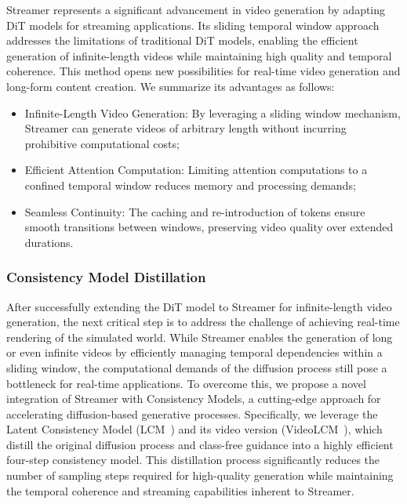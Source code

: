 Streamer represents a significant advancement in video generation by adapting DiT models for streaming applications. Its sliding temporal window approach addresses the limitations of traditional DiT models, enabling the efficient generation of infinite-length videos while maintaining high quality and temporal coherence. This method opens new possibilities for real-time video generation and long-form content creation. We summarize its advantages as follows:
\begin{itemize}
    \item Infinite-Length Video Generation: By leveraging a sliding window mechanism, Streamer can generate videos of arbitrary length without incurring prohibitive computational costs;
\item Efficient Attention Computation: Limiting attention computations to a confined temporal window reduces memory and processing demands;
\item Seamless Continuity: The caching and re-introduction of tokens ensure smooth transitions between windows, preserving video quality over extended durations.
\end{itemize}


\subsubsection{Consistency Model Distillation}
After successfully extending the DiT model to Streamer for infinite-length video generation, the next critical step is to address the challenge of achieving real-time rendering of the simulated world. While Streamer enables the generation of long or even infinite videos by efficiently managing temporal dependencies within a sliding window, the computational demands of the diffusion process still pose a bottleneck for real-time applications. To overcome this, we propose a novel integration of Streamer with Consistency Models, a cutting-edge approach for accelerating diffusion-based generative processes. Specifically, we leverage the Latent Consistency Model (LCM~\citep{luo2023latent}) and its video version (VideoLCM~\citep{wang2023videolcm}), which distill the original diffusion process and  class-free guidance into a highly efficient four-step consistency model. This distillation process significantly reduces the number of sampling steps required for high-quality generation while maintaining the temporal coherence and streaming capabilities inherent to Streamer.

